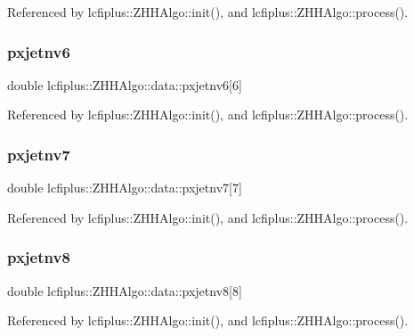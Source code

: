 Referenced by lcfiplus\+::\+Z\+H\+H\+Algo\+::init(), and lcfiplus\+::\+Z\+H\+H\+Algo\+::process().

\mbox{\label{structlcfiplus_1_1ZHHAlgo_1_1data_a01c29a6cec3aebb79ffe104bd9c3f8b6}} 
\subsubsection{pxjetnv6}
{\footnotesize\ttfamily double lcfiplus\+::\+Z\+H\+H\+Algo\+::data\+::pxjetnv6[6]}



Referenced by lcfiplus\+::\+Z\+H\+H\+Algo\+::init(), and lcfiplus\+::\+Z\+H\+H\+Algo\+::process().

\mbox{\label{structlcfiplus_1_1ZHHAlgo_1_1data_a5b13b2f85f52268fe67d006a8d708b61}} 
\subsubsection{pxjetnv7}
{\footnotesize\ttfamily double lcfiplus\+::\+Z\+H\+H\+Algo\+::data\+::pxjetnv7[7]}



Referenced by lcfiplus\+::\+Z\+H\+H\+Algo\+::init(), and lcfiplus\+::\+Z\+H\+H\+Algo\+::process().

\mbox{\label{structlcfiplus_1_1ZHHAlgo_1_1data_a94f0c48988755401bf5e9d31b50568c4}} 
\subsubsection{pxjetnv8}
{\footnotesize\ttfamily double lcfiplus\+::\+Z\+H\+H\+Algo\+::data\+::pxjetnv8[8]}



Referenced by lcfiplus\+::\+Z\+H\+H\+Algo\+::init(), and lcfiplus\+::\+Z\+H\+H\+Algo\+::process().

\mbox{\label{structlcfiplus_1_1ZHHAlgo_1_1data_a2aa4b51d5ad057d8e4f281f03f044b89}} 
